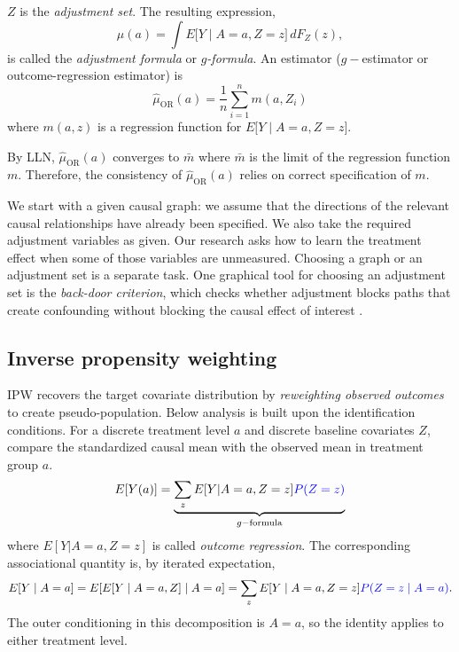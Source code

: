 \documentclass[11pt,twoside]{article}
\begin{document}
$Z$ is the \emph{adjustment set}. The resulting expression,
\begin{equation}
\label{eq:g-formula}
    \boxed{\mu(a)=\int E\big[Y\mid A=a,Z=z\big]\,dF_Z(z)},
\end{equation}
is called the \emph{adjustment formula} or \emph{$g$-formula}. An estimator ($g-$estimator or outcome-regression estimator) is
\begin{equation}
    \label{eq:g-est}
    \boxed{\hat{\mu}_{\text{OR}}(a)=\frac{1}{n}\sum_{i=1}^n m(a,Z_i)}
\end{equation}
where $m(a,z)$ is a regression function for $E\big[Y\mid A=a,Z=z\big]$.

\begin{remark}
    By LLN, $\hat{\mu}_{\text{OR}}(a)$ converges to $\bar{m}$ where $\bar{m}$ is the limit of the regression function $m$. Therefore, the consistency of $\hat{\mu}_{\text{OR}}(a)$ relies on correct specification of $m$.
\end{remark}

\begin{remark}
We start with a given causal graph: we assume that the directions of the relevant causal relationships have already been specified. We also take the required adjustment variables as given. Our research asks how to learn the treatment effect when some of those variables are unmeasured. Choosing a graph or an adjustment set is a separate task. One graphical tool for choosing an adjustment set is the \emph{back-door criterion}, which checks whether adjustment blocks paths that create confounding without blocking the causal effect of interest \cite{Pearl2009}.
\end{remark}

\subsection{Inverse propensity weighting}
IPW recovers the target covariate distribution by \emph{reweighting observed outcomes} to create pseudo-population. Below analysis is built upon the identification conditions. For a discrete treatment level $a$ and discrete baseline covariates $Z$, compare the standardized causal mean with the observed mean in treatment group $a$.
\[
E[Y(a)] = \underbrace{\sum_z E[Y|A=a,Z=z]\textcolor{blue}{P(Z=z)}}_{g-\text{formula}}
\]
where $E[Y|A=a,Z=z]$ is called \emph{outcome regression}.
The corresponding associational quantity is, by iterated expectation,
\[
E[Y\mid A=a] = E\!\left[E[Y\mid A=a,Z]\mid A=a\right] = \sum_z E[Y\mid A=a,Z=z]\textcolor{blue}{P(Z=z\mid A=a)}.
\]
The outer conditioning in this decomposition is $A=a$, so the identity applies to either treatment level.
\end{document}
